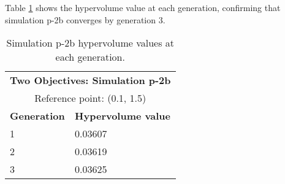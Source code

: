 Table \ref{tab:p2b-hypervolume} shows the hypervolume value at each generation, 
confirming that simulation p-2b converges by generation 3. 
\begin{table}[htbp!]
    \centering
    \onehalfspacing
    \caption{Simulation p-2b hypervolume values at each generation.}
	\label{tab:p2b-hypervolume}
    \footnotesize
    \begin{tabular}{ll}
    \hline 
    \multicolumn{2}{c}{\textbf{Two Objectives: Simulation p-2b}} \\
    \multicolumn{2}{c}{Reference point: (0.1, 1.5)} \\
    \hline 
    \textbf{Generation} & \textbf{Hypervolume value} \\
    \hline
    1 & 0.03607 \\
    2 & 0.03619 \\
    3 & 0.03625 \\
    \hline
    \end{tabular}
\end{table}


